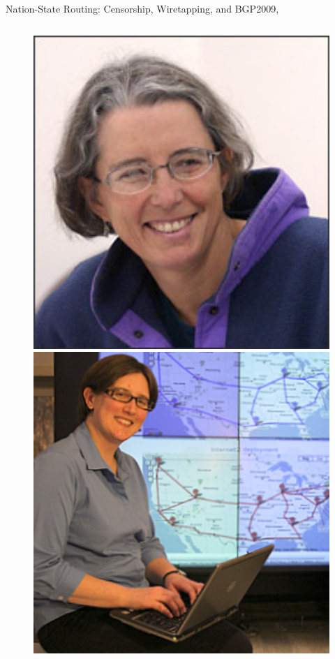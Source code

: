 \documentclass[ngerman,compress,hyperref={bookmarks}]{beamer}
\begin{document}
\begin{frame}{Nation-State Routing: Censorship, Wiretapping, and BGP}{2009, \cite{0903.3218v1}}
\begin{columns}[c]
\begin{column}{0.09\textwidth}
\begin{figure}
        \includegraphics[width=1\textwidth]{images/forrest_s}\\
        \includegraphics[width=1\textwidth]{images/rexford_j}

\end{figure}
\end{column}
\end{columns}
\end{frame}
\end{document}
